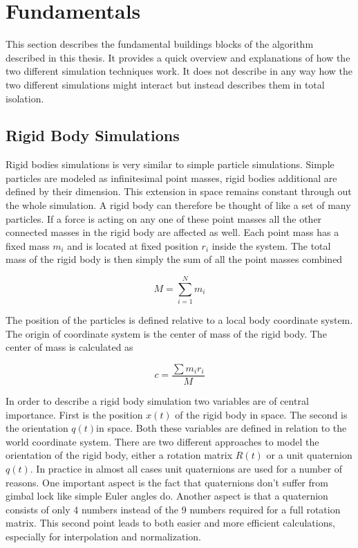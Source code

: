 \chapter{Fundamentals}
\label{cha:fundamentals}

This section describes the fundamental buildings blocks of the algorithm described in this thesis. It provides a quick overview and explanations of how the two different simulation techniques work. It does not describe in any way how the two different simulations might interact but instead describes them in total isolation.

\section{Rigid Body Simulations}
\label{sec:rigid_body_simulations}

Rigid bodies simulations is very similar to simple particle simulations. Simple particles are modeled as infinitesimal point masses, rigid bodies additional are defined by their dimension. This extension in space remains constant through out the whole simulation. A rigid body can therefore be thought of like a set of many particles. If a force is acting on any one of these point masses all the other connected masses in the rigid body are affected as well. Each point mass has a fixed mass $m_i$ and is located at fixed position $r_i$ inside the system. The total mass of the rigid body is then simply the sum of all the point masses combined

\[
M = \sum\limits_{i=1}^N m_i
\]

The position of the particles is defined relative to a local body coordinate system. The origin of coordinate system is the center of mass of the rigid body. The center of mass is calculated as 

\[
c = \frac{\sum m_i r_i}{M}
\]

In order to describe a rigid body simulation two variables are of central importance. First is the position \(x(t)\) of the rigid body in space. The second is the orientation \(q(t)\)in space. Both these variables are defined in relation to the world coordinate system. There are two different approaches to model the orientation of the rigid body, either a rotation matrix $R(t)$ or a unit quaternion $q(t)$. In practice in almost all cases unit quaternions are used for a number of reasons. One important aspect is the fact that quaternions don't suffer from gimbal lock like simple Euler angles do. Another aspect is that a quaternion consists of only 4 numbers instead of the 9 numbers required for a full rotation matrix. This second point leads to both easier and more efficient calculations, especially for interpolation and normalization.

